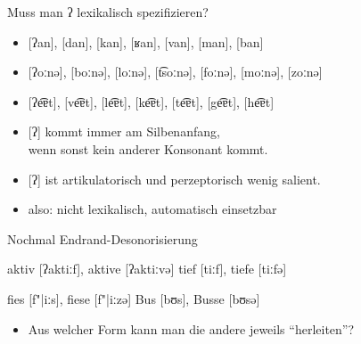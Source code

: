 \begin{frame}
  {Muss man ʔ lexikalisch spezifizieren?}
  \pause
  \begin{itemize}[<+->]
    \item{[ʔan], [dan], [kan], [ʁan], [van], [man], [ban]}
    \item{[ʔoːnə], [boːnə], [loːnə], [t͡soːnə], [foːnə], [moːnə], [zoːnə]}
    \item{[ʔe͡ɐt], [ve͡ɐt], [le͡ɐt], [ke͡ɐt], [te͡ɐt], [ge͡ɐt], [he͡ɐt]}
  \end{itemize}
  \Zeile
  \pause
  \begin{itemize}[<+->]
    \item{\alert{[ʔ] kommt immer am Silbenanfang,\\
      wenn sonst kein anderer Konsonant kommt.}}
    \item{[ʔ] ist artikulatorisch und perzeptorisch wenig salient.}
    \item also: nicht lexikalisch, \alert{automatisch einsetzbar}
  \end{itemize}
\end{frame}

\begin{frame}
  {Nochmal Endrand-Desonorisierung}
  \pause
  \begin{exe}
    \ex
    \begin{xlist}
    \end{xlist}
    \ex
    \begin{xlist}
    \end{xlist}
    \ex
    \begin{xlist}
    \end{xlist}
    \ex
    \begin{xlist}
      \ex aktiv [ʔaktiːf], aktive [ʔaktiːvə]
      \ex tief [tiːf], tiefe [tiːfə]
    \end{xlist}
    \ex
    \begin{xlist}
      \ex fies [f"|iːs], fiese [f"|iːzə]
      \ex Bus [bʊs], Busse [bʊsə]
    \end{xlist}
  \end{exe}
  \pause
  \Zeile
  \begin{itemize}
    \item \alert{Aus welcher Form kann man die andere jeweils "`herleiten"'?}
  \end{itemize}
\end{frame}


